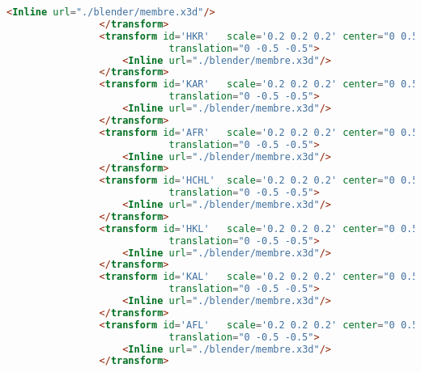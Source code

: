\begin{lstlisting}[language=Html]
                	<Inline url="./blender/membre.x3d"/>
                </transform>
                <transform id='HKR'   scale='0.2 0.2 0.2' center="0 0.5 0" 
                			translation="0 -0.5 -0.5">
                	<Inline url="./blender/membre.x3d"/>
                </transform>
                <transform id='KAR'   scale='0.2 0.2 0.2' center="0 0.5 0" 
                			translation="0 -0.5 -0.5">
                	<Inline url="./blender/membre.x3d"/>
                </transform>
                <transform id='AFR'   scale='0.2 0.2 0.2' center="0 0.5 0" 
                			translation="0 -0.5 -0.5">
                	<Inline url="./blender/membre.x3d"/>
                </transform>
                <transform id='HCHL'  scale='0.2 0.2 0.2' center="0 0.5 0"
                			translation="0 -0.5 -0.5">
                	<Inline url="./blender/membre.x3d"/>
                </transform>
                <transform id='HKL'   scale='0.2 0.2 0.2' center="0 0.5 0" 
                			translation="0 -0.5 -0.5">
                	<Inline url="./blender/membre.x3d"/>
                </transform>
                <transform id='KAL'   scale='0.2 0.2 0.2' center="0 0.5 0" 
                			translation="0 -0.5 -0.5">
                	<Inline url="./blender/membre.x3d"/>
                </transform>
                <transform id='AFL'   scale='0.2 0.2 0.2' center="0 0.5 0" 
                			translation="0 -0.5 -0.5">
                	<Inline url="./blender/membre.x3d"/>
                </transform>


\end{lstlisting}
